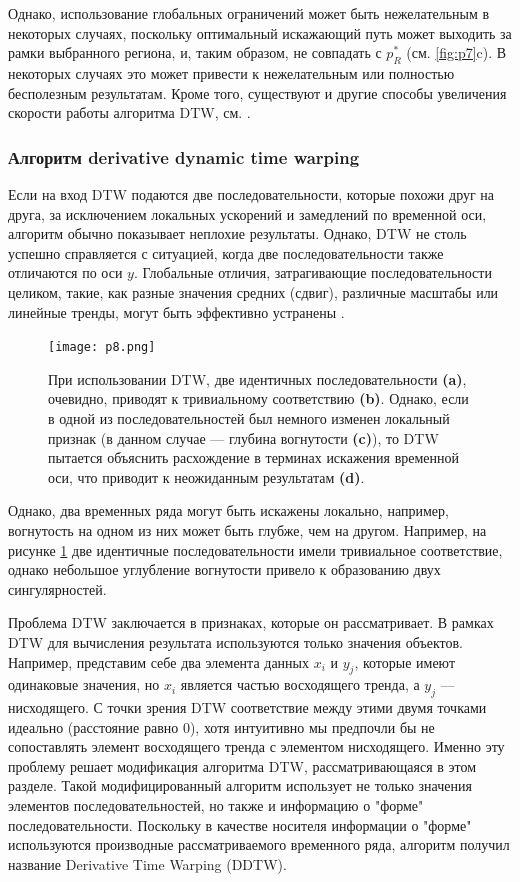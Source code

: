\documentclass[a4paper, 14pt]{extarticle}
\numberwithin{figure}{subsection}
\numberwithin{equation}{subsection}
\begin{document}
Однако, использование глобальных ограничений может быть нежелательным в некоторых случаях, поскольку оптимальный искажающий путь может выходить за рамки выбранного региона, и, таким образом, не совпадать с $p_R^*$ (см. \ref{fig:p7}c). В некоторых случаях это может привести к нежелательным или полностью бесполезным результатам. Кроме того, существуют и другие способы увеличения скорости работы алгоритма DTW, см. \cite{m80}.

\subsubsection{Алгоритм derivative dynamic time warping}

Если на вход DTW подаются две последовательности, которые похожи друг на друга, за исключением локальных ускорений и замедлений по временной оси, алгоритм обычно показывает неплохие результаты. Однако, DTW не столь успешно справляется с ситуацией, когда две последовательности также отличаются по оси $y$. Глобальные отличия, затрагивающие последовательности целиком, такие, как разные значения средних (сдвиг), различные масштабы или линейные тренды, могут быть эффективно устранены \cite{kp98, aea95}.

\begin{figure}[h]
\centering
\texttt{[image: p8.png]}
\caption{При использовании DTW, две идентичных последовательности {\bf (a)}, очевидно, приводят к тривиальному соответствию {\bf (b)}. Однако, если в одной из последовательностей был немного изменен локальный признак (в данном случае --- глубина вогнутости {\bf (c)}), то DTW пытается объяснить расхождение в терминах искажения временной оси, что приводит к неожиданным результатам {\bf (d)}.}
\label{fig:p8}
\end{figure}

Однако, два временных ряда могут быть искажены локально, например, вогнутость на одном из них может быть глубже, чем на другом. Например, на рисунке \ref{fig:p8} две идентичные последовательности имели тривиальное соответствие, однако небольшое углубление вогнутости привело к образованию двух сингулярностей.

Проблема DTW заключается в признаках, которые он рассматривает. В рамках DTW для вычисления результата используются только значения объектов. Например, представим себе два элемента данных $x_i$ и $y_j$, которые имеют одинаковые значения, но $x_i$ является частью восходящего тренда, а $y_j$ --- нисходящего. С точки зрения DTW соответствие между этими двумя точками идеально (расстояние равно 0), хотя интуитивно мы предпочли бы не сопоставлять элемент восходящего тренда с элементом нисходящего. Именно эту проблему решает модификация алгоритма DTW, рассматривающаяся в этом разделе. Такой модифицированный алгоритм использует не только значения элементов последовательностей, но также и информацию о "форме" последовательности. Поскольку в качестве носителя информации о "форме" используются производные рассматриваемого временного ряда, алгоритм получил название Derivative Time Warping (DDTW).
\end{document}

